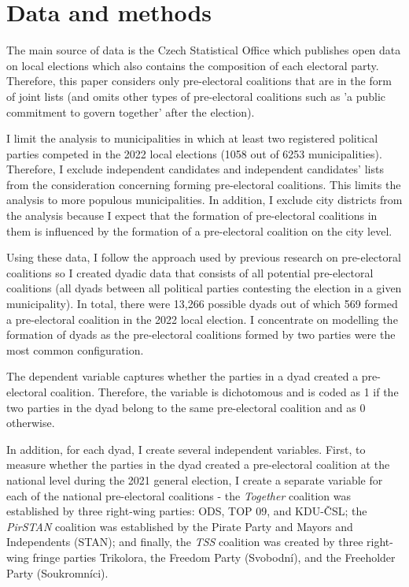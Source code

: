 \documentclass[]{interact}
\theoremstyle{plain}%
\theoremstyle{definition}
\theoremstyle{remark}
\begin{document}
\section{Data and methods}

The main source of data is the Czech Statistical Office which publishes open data on local elections which also contains the composition of each electoral party. Therefore, this paper considers only pre-electoral coalitions that are in the form of joint lists (and omits other types of pre-electoral coalitions such as 'a public commitment to govern together' after the election). 

I limit the analysis to municipalities in which at least two registered political parties competed in the 2022 local elections (1058 out of 6253 municipalities). Therefore, I exclude independent candidates and independent candidates' lists from the consideration concerning forming pre-electoral coalitions. This limits the analysis to more populous municipalities. In addition, I exclude city districts from the analysis because I expect that the formation of pre-electoral coalitions in them is influenced by the formation of a pre-electoral coalition on the city level. 

Using these data, I follow the approach used by previous research on pre-electoral coalitions \citep{golder2005,ibenskas2016} so I created dyadic data that consists of all potential pre-electoral coalitions (all dyads between all political parties contesting the election in a given municipality). In total, there were 13,266 possible dyads out of which 569 formed a pre-electoral coalition in the 2022 local election. I concentrate on modelling the formation of dyads as the pre-electoral coalitions formed by two parties were the most common configuration.

The dependent variable captures whether the parties in a dyad created a pre-electoral coalition. Therefore, the variable is dichotomous and is coded as 1 if the two parties in the dyad belong to the same pre-electoral coalition and as 0 otherwise. 

In addition, for each dyad, I create several independent variables. 
First, to measure whether the parties in the dyad created a pre-electoral coalition at the national level during the 2021 general election, I create a separate variable for each of the national pre-electoral coalitions - the \emph{Together} coalition was established by three right-wing parties: ODS, TOP 09, and KDU-ČSL; the \emph{PirSTAN} coalition was established by the Pirate Party and Mayors and Independents (STAN); and finally, the \emph{TSS} coalition was created by three right-wing fringe parties Trikolora, the Freedom Party (Svobodní), and the Freeholder Party (Soukromníci). 
\end{document}
